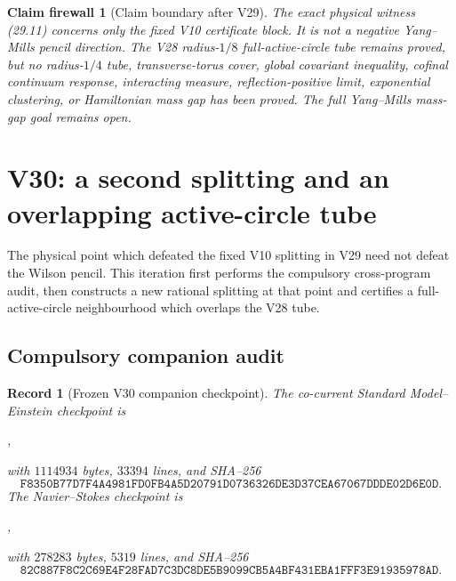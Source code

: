 \documentclass[11pt,oneside]{article}
\newtheorem{firewall}[theorem]{Claim firewall}
\newtheorem{record}[theorem]{Record}
\theoremstyle{definition}
\theoremstyle{remark}
\begin{document}
\begin{firewall}[Claim boundary after V29]
\label{fire:newv29-final}
The exact physical witness (29.11) concerns only the fixed V10
certificate block.  It is not a negative Yang--Mills pencil
direction.  The V28 radius-\(1/8\) full-active-circle tube remains
proved, but no radius-\(1/4\) tube, transverse-torus cover, global
covariant inequality, cofinal continuum response, interacting
measure, reflection-positive limit, exponential clustering, or
Hamiltonian mass gap has been proved.  The full Yang--Mills
mass-gap goal remains open.
\end{firewall}

\section{V30: a second splitting and an overlapping active-circle tube}
\label{sec:newv30-second-tube}

The physical point which defeated the fixed V10 splitting in V29
need not defeat the Wilson pencil.  This iteration first performs
the compulsory cross-program audit, then constructs a new rational
splitting at that point and certifies a full-active-circle
neighbourhood which overlaps the V28 tube.

\subsection{Compulsory companion audit}

\begin{record}[Frozen V30 companion checkpoint]
\label{rec:newv30-companions}
The co-current Standard Model--Einstein checkpoint is
\begin{center}
,
\end{center}
with \(1114934\) bytes, \(33394\) lines, and SHA--256
\[
\texttt{F8350B77D7F4A4981FD0FB4A5D20791D0736326DE3D37CEA67067DDDE02D6E0D}.
                                                               \tag{30.1}
\]
The Navier--Stokes checkpoint is
\begin{center}
,
\end{center}
with \(278283\) bytes, \(5319\) lines, and SHA--256
\[
\texttt{82C887F8C2C69E4F28FAD7C3DC8DE5B9099CB5A4BF431EBA1FFF3E91935978AD}.
                                                               \tag{30.2}
\]
\end{record}
\end{document}
